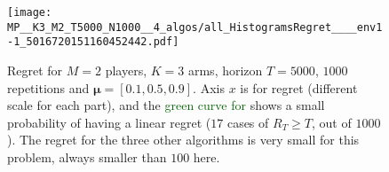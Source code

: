 %
%
\begin{figure}[!t]
  \centering
      \texttt{[image: MP\_\_K3\_M2\_T5000\_N1000\_\_4\_algos/all\_HistogramsRegret\_\_\_\_env1-1\_5016720151160452442.pdf]}
  \caption[Failure case of \Selfish.]{Regret for $M=2$ players, $K=3$ arms, horizon $T=5000$, $1000$ repetitions and $\boldsymbol{\mu} = [0.1, 0.5, 0.9]$. Axis $x$ is for regret (different scale for each part), and the \textcolor{darkgreen}{green curve for \Selfish} shows a small probability of having a linear regret ($17$ cases of $R_T \geq T$, out of $1000$). The regret for the three other algorithms is very small for this problem, always smaller than $100$ here.}
  \label{fig:5:selfish_fail1}
\end{figure}



